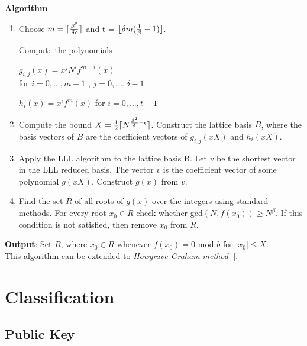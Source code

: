 \documentclass[a4paper]{article}
\begin{document}
\textbf{Algorithm}
\begin{enumerate}[label=(\roman*)]
      \item Choose $m=\lceil {\beta^2 \over \delta \epsilon} \rceil$ and t = $\lfloor \delta m ({1 \over \beta}-1) \rfloor$. 
      
      Compute the polynomials 
      
      $g_{i,j} (x) = x^j N^i f^{m-i} (x)$ \\ for $i=0,...,m-1$ ,  $j=0,...,\delta-1$
      
      $h_i(x) = x^i f^m (x)$ for $i=0,...,t-1$
      \item Compute the bound $ X= {1 \over 2} \lceil N^{{\beta^2 \over \delta} - \epsilon} \rceil$. Construct the lattice basis $B$, where the basis vectors of $B$ are the coefficient vectors of $g_{i,j}(xX)$ and $h_i(xX)$.
      \item Apply the LLL algorithm to the lattice basis B. Let $v$ be the shortest vector in the LLL reduced basis. The vector $v$ is the coefficient vector of some polynomial $g(xX)$. Construct $g(x)$ from $v$.
      \item Find the set $R$ of all roots of $g(x)$ over the integers using standard methods. For every root $x_0 \in R$ check whether gcd$(N,f(x_0)) \geq N^{\beta}$. If this condition is not satisfied, then remove $x_0$ from $R$.
\end{enumerate} 

\textbf{Output}: Set $R$, where $x_0 \in R$ whenever $f(x_0)=0$ mod $b$ for $|x_0| \leq X$.
\\

This algorithm can be extended to \textit{Howgrave-Graham method} [].

\section{Classification}

\subsection{Public Key}
\end{document}
